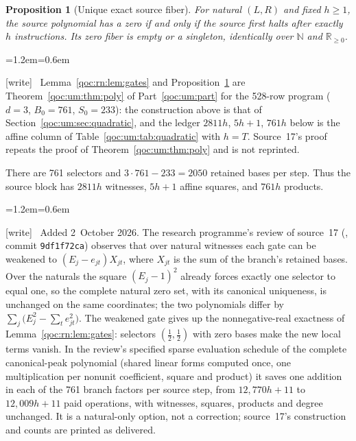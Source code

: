\documentclass[11pt,letterpaper]{article}
\newtheorem{proposition}[theorem]{Proposition}
\theoremstyle{definition}
\theoremstyle{remark}
\newcommand{\N}{\mathbb N}
\newcommand{\Rp}{\mathbb R_{\geq0}}
\newcommand{\wtag}{\textup{[write]}}
\newenvironment{writenote}{\par\smallskip\begin{list}{}{\leftmargin=1.2em\rightmargin=0.6em}\item[]\small\wtag\ }{\end{list}\smallskip}
\begin{document}
\begin{proposition}[Unique exact source fiber]
\label{qoc:rn:prop:sourcefiber}
For natural $(L,R)$ and fixed $h\geq1$, the source polynomial has a zero if and only if the source first halts after exactly $h$ instructions. Its zero fiber is empty or a singleton, identically over $\N$ and $\Rp$.
\end{proposition}
\begin{writenote}
Lemma~\ref{qoc:rn:lem:gates} and Proposition~\ref{qoc:rn:prop:sourcefiber} are Theorem~\ref{qoc:um:thm:poly} of Part~\ref{qoc:um:part} for the 528-row program ($d=3$, $B_0=761$, $S_0=233$): the construction above is that of Section~\ref{qoc:um:sec:quadratic}, and the ledger $2811h$, $5h+1$, $761h$ below is the affine column of Table~\ref{qoc:um:tab:quadratic} with $h=T$. Source~17's proof repeats the proof of Theorem~\ref{qoc:um:thm:poly} and is not reprinted.
\end{writenote}

There are 761 selectors and $3\cdot761-233=2050$ retained bases per step. Thus the source block has $2811h$ witnesses, $5h+1$ affine squares, and $761h$ products.

\begin{writenote}
Added 2~October 2026. The research programme's review of source~17 (, commit \texttt{9df1f72ca}) observes that over natural witnesses each gate can be weakened to $(E_j-e_{jt})X_{jt}$, where $X_{jt}$ is the sum of the branch's retained bases. Over the naturals the square $(E_j-1)^2$ already forces exactly one selector to equal one, so the complete natural zero set, with its canonical uniqueness, is unchanged on the same coordinates; the two polynomials differ by $\sum_j\bigl(E_j^2-\sum_t e_{jt}^2\bigr)$. The weakened gate gives up the nonnegative-real exactness of Lemma~\ref{qoc:rn:lem:gates}: selectors $(\tfrac12,\tfrac12)$ with zero bases make the new local terms vanish. In the review's specified sparse evaluation schedule of the complete canonical-peak polynomial (shared linear forms computed once, one multiplication per nonunit coefficient, square and product) it saves one addition in each of the 761 branch factors per source step, from $12{,}770h+11$ to $12{,}009h+11$ paid operations, with witnesses, squares, products and degree unchanged. It is a natural-only option, not a correction; source~17's construction and counts are printed as delivered.
\end{writenote}
\end{document}
